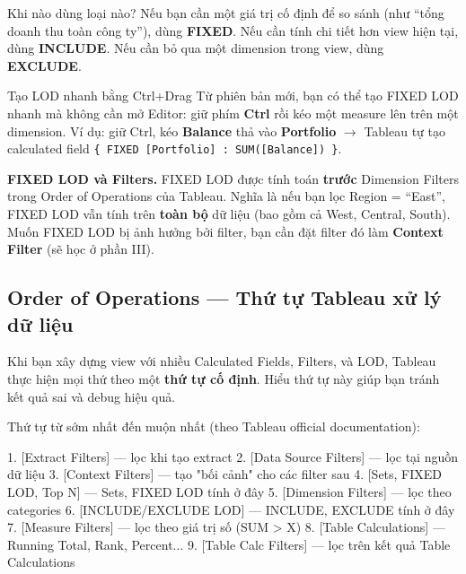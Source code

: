 \documentclass[12pt]{article}
\begin{document}
\noindent Khi nào dùng loại nào? Nếu bạn cần một giá trị cố định để so sánh (như ``tổng doanh thu toàn công ty''), dùng \textbf{FIXED}. Nếu cần tính chi tiết hơn view hiện tại, dùng \textbf{INCLUDE}. Nếu cần bỏ qua một dimension trong view, dùng \textbf{EXCLUDE}.

\begin{guidelinebox}{Tạo LOD nhanh bằng Ctrl+Drag}
Từ phiên bản mới, bạn có thể tạo FIXED LOD nhanh mà không cần mở Editor: giữ phím \textbf{Ctrl} rồi kéo một measure lên trên một dimension. Ví dụ: giữ Ctrl, kéo \textbf{Balance} thả vào \textbf{Portfolio} $\rightarrow$ Tableau tự tạo calculated field \texttt{\{ FIXED [Portfolio] : SUM([Balance]) \}}.
\end{guidelinebox}

\begin{notebox}
\textbf{FIXED LOD và Filters.} FIXED LOD được tính toán \textbf{trước} Dimension Filters trong Order of Operations của Tableau. Nghĩa là nếu bạn lọc Region = ``East'', FIXED LOD vẫn tính trên \textbf{toàn bộ} dữ liệu (bao gồm cả West, Central, South). Muốn FIXED LOD bị ảnh hưởng bởi filter, bạn cần đặt filter đó làm \textbf{Context Filter} (sẽ học ở phần III).
\end{notebox}

\subsection{Order of Operations --- Thứ tự Tableau xử lý dữ liệu}

\noindent Khi bạn xây dựng view với nhiều Calculated Fields, Filters, và LOD, Tableau thực hiện mọi thứ theo một \textbf{thứ tự cố định}. Hiểu thứ tự này giúp bạn tránh kết quả sai và debug hiệu quả.

\noindent Thứ tự từ sớm nhất đến muộn nhất (theo Tableau official documentation):

\begin{aivncodebox}[]
\begin{python}
1. [Extract Filters]         — lọc khi tạo extract
2. [Data Source Filters]     — lọc tại nguồn dữ liệu
3. [Context Filters]         — tạo "bối cảnh" cho các filter sau
4. [Sets, FIXED LOD, Top N]  — Sets, FIXED LOD tính ở đây
5. [Dimension Filters]       — lọc theo categories
6. [INCLUDE/EXCLUDE LOD]     — INCLUDE, EXCLUDE tính ở đây
7. [Measure Filters]         — lọc theo giá trị số (SUM > X)
8. [Table Calculations]      — Running Total, Rank, Percent...
9. [Table Calc Filters]      — lọc trên kết quả Table Calculations
\end{python}
\end{aivncodebox}
\end{document}
